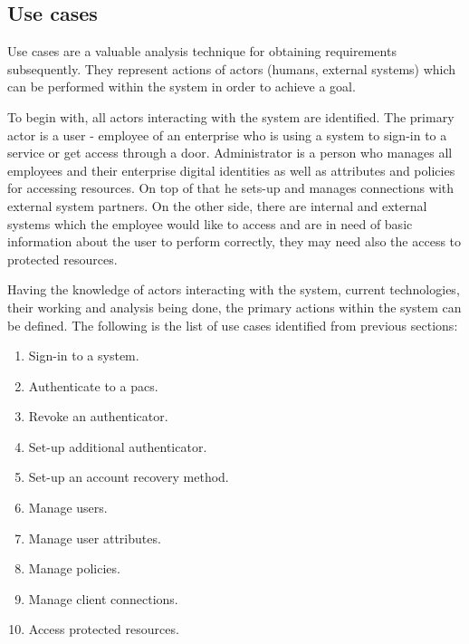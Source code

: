\subsection{Use cases} \label{sec:analysis_useCases}
Use cases are a valuable analysis technique for obtaining requirements subsequently. They represent actions of actors (humans, external systems) which can be performed within the system in order to achieve a goal. 

To begin with, all actors interacting with the system are identified. The primary actor is a user - employee of an enterprise who is using a system to sign-in to a service or get access through a door. Administrator is a person who manages all employees and their enterprise digital identities as well as attributes and policies for accessing resources. On top of that he sets-up and manages connections with external system partners. On the other side, there are internal and external systems which the employee would like to access and are in need of basic information about the user to perform correctly, they may need also the access to protected resources.

Having the knowledge of actors interacting with the system, current technologies, their working and analysis being done, the primary actions within the system can be defined. The following is the list of use cases identified from previous sections:

\begin{enumerate}[noitemsep]
    \item Sign-in to a system.
    \item Authenticate to a \acrlong{pacs}.
    \item Revoke an authenticator.
    \item Set-up additional authenticator.
    \item Set-up an account recovery method.
    \item Manage users.
    \item Manage user attributes.
    \item Manage policies.
    \item Manage client connections.
    \item Access protected resources.
\end{enumerate}

